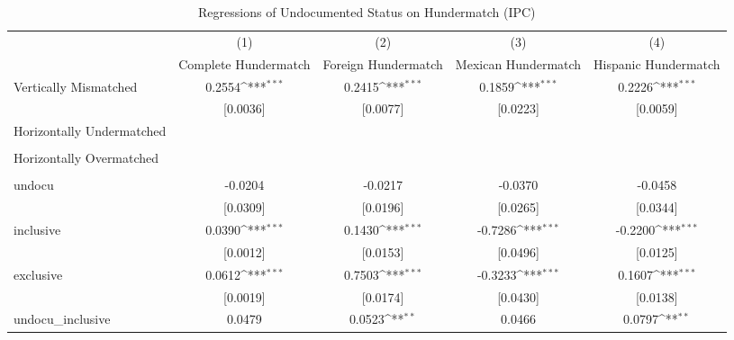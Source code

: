 \begin{table}[htbp]\centering
\def\sym#1{\ifmmode^{#1}\else\(^{#1}\)\fi}
\caption{Regressions of Undocumented Status on Hundermatch (IPC)}
\begin{tabular}{l*{4}{c}}
\toprule
                    &\multicolumn{1}{c}{(1)}         &\multicolumn{1}{c}{(2)}         &\multicolumn{1}{c}{(3)}         &\multicolumn{1}{c}{(4)}         \\
                    &Complete Hundermatch         &Foreign Hundermatch         &Mexican Hundermatch         &Hispanic Hundermatch         \\
\midrule
Vertically Mismatched&      0.2554\sym{***}&      0.2415\sym{***}&      0.1859\sym{***}&      0.2226\sym{***}\\
                    &    [0.0036]         &    [0.0077]         &    [0.0223]         &    [0.0059]         \\
\addlinespace
Horizontally Undermatched&                     &                     &                     &                     \\
                    &                     &                     &                     &                     \\
\addlinespace
Horizontally Overmatched&                     &                     &                     &                     \\
                    &                     &                     &                     &                     \\
\addlinespace
undocu              &     -0.0204         &     -0.0217         &     -0.0370         &     -0.0458         \\
                    &    [0.0309]         &    [0.0196]         &    [0.0265]         &    [0.0344]         \\
\addlinespace
inclusive           &      0.0390\sym{***}&      0.1430\sym{***}&     -0.7286\sym{***}&     -0.2200\sym{***}\\
                    &    [0.0012]         &    [0.0153]         &    [0.0496]         &    [0.0125]         \\
\addlinespace
exclusive           &      0.0612\sym{***}&      0.7503\sym{***}&     -0.3233\sym{***}&      0.1607\sym{***}\\
                    &    [0.0019]         &    [0.0174]         &    [0.0430]         &    [0.0138]         \\
\addlinespace
undocu\_inclusive    &      0.0479         &      0.0523\sym{**} &      0.0466         &      0.0797\sym{**} \\

\end{tabular}
\end{table}
